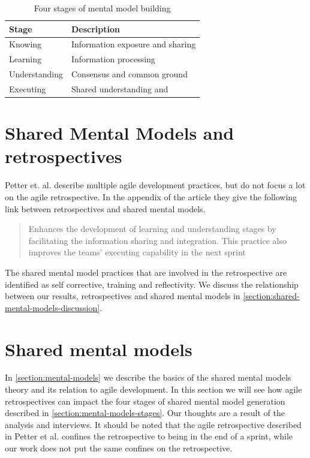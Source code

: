 \begin{table}[!h]
	\begin{centering}
	\caption{Four stages of mental model building}
	\label{table:stages-mental-model}
	\begin{tabular}{l | p{}}

	\hline
	Stage & Description \\
	\hline
	Knowing &  Information exposure and sharing\\
	Learning & Information processing \\
	Understanding & Consensus and common ground \\
	Executing & Shared understanding and  \\
	\hline
	
\end{tabular}
\end{centering}
\end{table}

	
\section{Shared Mental Models and retrospectives}

Petter et. al. \cite{Petter2013} describe multiple agile development practices, but do not focus a lot on the agile retrospective. In the appendix of the article they give the following link between retrospectives and shared mental models.

\begin{quote}
Enhances the development of learning and understanding stages by facilitating the information sharing and integration. This practice also improves the teams’ executing capability in the next sprint
\end{quote}

The shared mental model practices that are involved in the retrospective are identified as self corrective, training and reflectivity. We discuss the relationship between our results, retrospectives and shared mental models in \autoref{section:shared-mental-models-discussion}.


\section{Shared mental models}
\label{section:shared-mental-models-discussion}
In \autoref{section:mental-models} we describe the basics of the shared mental models theory and its relation to agile development. In this section we will see how agile retrospectives can impact the four stages of shared mental model generation described in \autoref{section:mental-models-stages}. Our thoughts are a result of the analysis and interviews. It should be noted that the agile retrospective described in Petter et al. \cite{Petter2013} confines the retrospective to being in the end of a sprint, while our work does not put the same confines on the retrospective.



